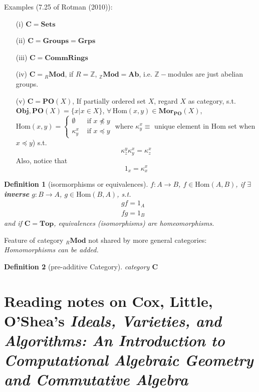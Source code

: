\documentclass[10pt]{amsart}
\newtheorem{definition}{Definition}
\begin{document}
\begin{multicols*}{2}
Examples (7.25 of Rotman (2010)\cite{JRotman2010}): 
\begin{enumerate}
\item[(i)] $\mathbf{C} = \mathbf{\text{Sets}}$  
\item[(ii)] $\mathbf{C} = \mathbf{\text{Groups}} = \mathbf{\text{Grps}}$ 
\item[(iii)]  $\mathbf{C} = \mathbf{\text{CommRings}}$
\item[(iv)]  $\mathbf{C} = {}_R\textbf{Mod}$, if $R=\mathbb{Z}$, ${}_{\mathbb{Z}}\textbf{Mod} = \textbf{Ab}$, i.e. $\mathbb{Z}-$modules are just abelian groups.   
\item[(v)] $\mathbf{C} =\textbf{PO}(X)$, If partially ordered set $X$, regard $X$ as category, s.t. $\textbf{Obj}, \textbf{PO}(X) = \lbrace x | x\in X\rbrace$, $\forall \, \text{Hom}(x,y) \in \textbf{Mor}_{\textbf{PO}}(X)$, $\text{Hom}(x,y) = \begin{cases} \emptyset & \text{ if } x \npreceq y \\  \kappa_y^x & \text{ if } x \preceq y   \end{cases}$ where $\kappa_y^x \equiv $ unique element in $\text{Hom}$ set when $x \preceq y$) s.t. 
\[
\kappa_z^y \kappa_y^x  =\kappa_z^x
\]
Also, notice that 
\[
1_x = \kappa_x^x
\]
\end{enumerate}

\begin{definition}[isormorphisms or equivalences]
$f:A\to B$, $f\in \text{Hom}(A,B)$, if $\exists \, $ \textbf{inverse} $g:B\to A$, $g\in \text{Hom}(B,A)$, s.t. 
\[
\begin{aligned}
& gf = 1_A \\ 
& fg = 1_B
\end{aligned}
\]
and if $\mathbf{C} = \textbf{Top}$, equivalences (isomorphisms) are homeomorphisms.  
\end{definition}

Feature of category ${}_R\textbf{Mod}$ not shared by more general categories: \emph{Homomorphisms can be added.}

\begin{definition}[pre-additive Category]
category $\mathbf{C}$
\end{definition}  





\part{Reading notes on Cox, Little, O'Shea's \emph{Ideals, Varieties, and Algorithms: An Introduction to Computational Algebraic Geometry and Commutative Algebra}}


\end{multicols*}
\end{document}
